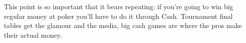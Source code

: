 This point is so important that it bears repeating: if you're going to
win big regular money at poker you'll have to do it through Cash.
Tournament final tables get the glamour and the media, big cash games
are where the pros make their actual money.





